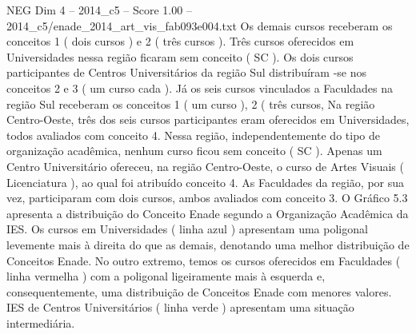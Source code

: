 \begin{textsample}{NEG Dim 4 – 2014\_c5 – Score 1.00 – 2014\_c5/enade\_2014\_art\_vis\_fab093e004.txt}
Os demais cursos receberam os conceitos 1 ( dois cursos ) e 2 ( três cursos ).
Três cursos oferecidos em Universidades nessa região ficaram sem conceito ( SC ).
Os dois cursos participantes de Centros Universitários da região Sul distribuíram -se nos conceitos 2 e 3 ( um curso cada ).
Já os seis cursos vinculados a Faculdades na região Sul receberam os conceitos 1 ( um curso ), 2 ( três cursos, Na região Centro-Oeste, três dos seis cursos participantes eram oferecidos em Universidades, todos avaliados com conceito 4.
Nessa região, independentemente do tipo de organização acadêmica, nenhum curso ficou sem conceito ( SC ).
Apenas um Centro Universitário ofereceu, na região Centro-Oeste, o curso de Artes Visuais ( Licenciatura ), ao qual foi atribuído conceito 4.
As Faculdades da região, por sua vez, participaram com dois cursos, ambos avaliados com conceito 3.
O Gráfico 5.3 apresenta a distribuição do Conceito Enade segundo a Organização Acadêmica da IES.
Os cursos em Universidades ( linha azul ) apresentam uma poligonal levemente mais à direita do que as demais, denotando uma melhor distribuição de Conceitos Enade.
No outro extremo, temos os cursos oferecidos em Faculdades ( linha vermelha ) com a poligonal ligeiramente mais à esquerda e, consequentemente, uma distribuição de Conceitos Enade com menores valores.
IES de Centros Universitários ( linha verde ) apresentam uma situação intermediária.

\end{textsample}
